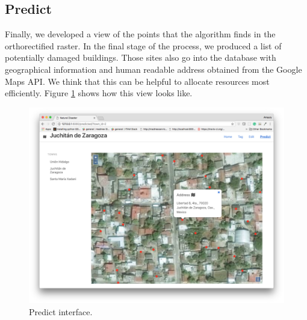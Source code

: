 \subsection{Predict}

Finally, we developed a view of the points that the algorithm finds in the orthorectified raster. In the final stage of the process, we produced a list of potentially damaged buildings. Those sites also go into the database with geographical information and human readable address obtained from the Google Maps API. We think that this can be helpful to allocate resources most efficiently. Figure \ref{fig:predict} shows how this view looks like.\\

\begin{figure}[!h]
  \centering
  \includegraphics[width=1\textwidth]{images/small-app-predict.png}
  \caption{Predict interface.}
  \label{fig:predict}
\end{figure}


